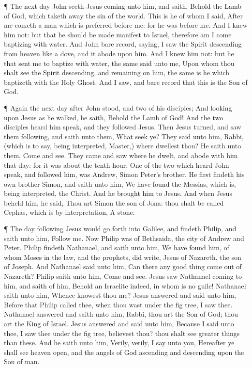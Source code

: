  ¶ The next day John seeth Jesus coming unto him, and
saith, Behold the Lamb of God, which taketh away the sin of the world.
 This is he of whom I said, After me cometh a man which is
preferred before me: for he was before me.  And I knew him
not: but that he should be made manifest to Israel, therefore am I come
baptizing with water.  And John bare record, saying, I saw
the Spirit descending from heaven like a dove, and it abode upon him.
 And I knew him not: but he that sent me to baptize with
water, the same said unto me, Upon whom thou shalt see the Spirit
descending, and remaining on him, the same is he which baptizeth with
the Holy Ghost.  And I saw, and bare record that this is
the Son of God.

 ¶ Again the next day after John stood, and two of his
disciples;  And looking upon Jesus as he walked, he saith,
Behold the Lamb of God!  And the two disciples heard him
speak, and they followed Jesus.  Then Jesus turned, and saw
them following, and saith unto them, What seek ye? They said unto him,
Rabbi, (which is to say, being interpreted, Master,) where dwellest
thou?  He saith unto them, Come and see. They came and saw
where he dwelt, and abode with him that day: for it was about the tenth
hour.  One of the two which heard John speak, and followed
him, was Andrew, Simon Peter's brother.  He first findeth
his own brother Simon, and saith unto him, We have found the Messias,
which is, being interpreted, the Christ.  And he brought
him to Jesus. And when Jesus beheld him, he said, Thou art Simon the son
of Jona: thou shalt be called Cephas, which is by interpretation, A
stone.

 ¶ The day following Jesus would go forth into Galilee, and
findeth Philip, and saith unto him, Follow me.  Now Philip
was of Bethsaida, the city of Andrew and Peter.  Philip
findeth Nathanael, and saith unto him, We have found him, of whom Moses
in the law, and the prophets, did write, Jesus of Nazareth, the son of
Joseph.  And Nathanael said unto him, Can there any good
thing come out of Nazareth? Philip saith unto him, Come and see.
 Jesus saw Nathanael coming to him, and saith of him,
Behold an Israelite indeed, in whom is no guile!  Nathanael
saith unto him, Whence knowest thou me? Jesus answered and said unto
him, Before that Philip called thee, when thou wast under the fig tree,
I saw thee.  Nathanael answered and saith unto him, Rabbi,
thou art the Son of God; thou art the King of Israel. 
Jesus answered and said unto him, Because I said unto thee, I saw thee
under the fig tree, believest thou? thou shalt see greater things than
these.  And he saith unto him, Verily, verily, I say unto
you, Hereafter ye shall see heaven open, and the angels of God ascending
and descending upon the Son of man.

